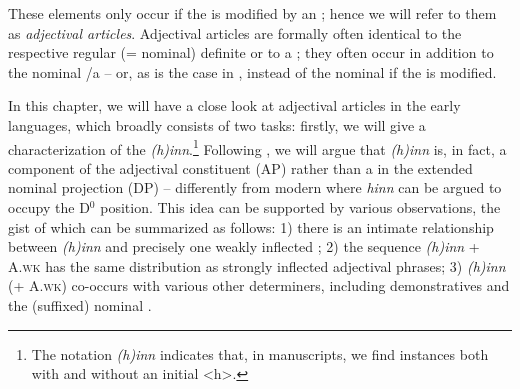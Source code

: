 \documentclass[output=paper,colorlinks,citecolor=brown]{langscibook}
\begin{document}
These  elements only occur if the  is modified by an ; hence we will refer to them as \textit{adjectival articles}. Adjectival articles are formally often identical to the respective regular (= nominal) definite  or to a ;  they often occur {in addition} to the nominal /a  -- or, as is the case in , {instead} of the nominal  if the  is modified. 

In this chapter, we will have a close look at adjectival articles in the early  languages, which broadly consists of two tasks: 
 firstly, we will give a characterization of the   \textit{(h)inn}.\footnote{The notation \textit{(h)inn} indicates that, in  manuscripts, we find instances both with and without an initial <h>.}
Following \citet{Pfaff2019,Pfaff2020,Pfaff2023}, we will argue that \textit{(h)inn} is, in fact, a component of the adjectival constituent (AP) rather than a  in the extended nominal projection (DP) -- differently from modern  where \textit{hinn} can be argued to occupy the D$^0$ position. This idea can be supported by various observations, the gist of which can be summarized as follows: 1) there is an intimate relationship between  \textit{(h)inn} and precisely one weakly inflected ; 2) the sequence \textit{(h)inn} + A.\textsc{wk} has the same distribution as strongly inflected adjectival phrases; 3) \textit{(h)inn} (+ A.\textsc{wk}) co-occurs with various other determiners, including demonstratives and the (suffixed) nominal . 
    
\end{document}
